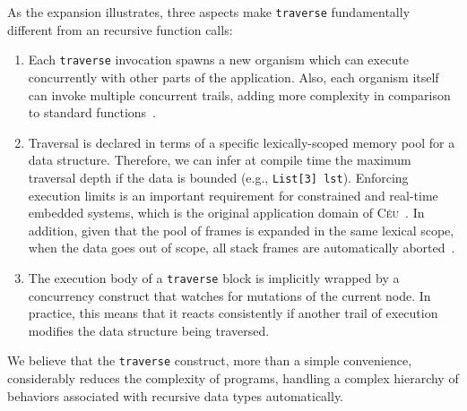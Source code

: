 \documentclass{sig-alternate}
\newcommand{\CEU}{\textsc{C\'{e}u}\xspace}
\newcommand{\code}[1] {{\small{\texttt{#1}}}}
\begin{document}
As the expansion illustrates, three aspects make \code{traverse} fundamentally 
different from an recursive function calls:
%
\begin{enumerate}
\item Each \code{traverse} invocation spawns a new organism which can execute 
concurrently with other parts of the application.
Also, each organism itself can invoke multiple concurrent trails, adding more 
complexity in comparison to standard functions~\cite{ceu.mod15}.
%
\item Traversal is declared in terms of a specific lexically-scoped memory pool 
for a data structure.
Therefore, we can infer at compile time the maximum traversal depth if the data 
is bounded (e.g., \code{List[3] lst}).
Enforcing execution limits is an important requirement for constrained and 
real-time embedded systems, which is the original application domain of 
\CEU~\cite{ceu.sensys13}.
In addition, given that the pool of frames is expanded in the same lexical 
scope, when the data goes out of scope, all stack frames are automatically 
aborted~\cite{ceu.mod15}.
%
\item The execution body of a \code{traverse} block is implicitly wrapped by a 
concurrency construct that watches for mutations of the current node.
In practice, this means that it reacts consistently if another trail of 
execution modifies the data structure being traversed.
\end{enumerate}

We believe that the \code{traverse} construct, more than a simple convenience, 
considerably reduces the complexity of programs, handling a complex hierarchy 
of behaviors associated with recursive data types automatically.

\end{document}
